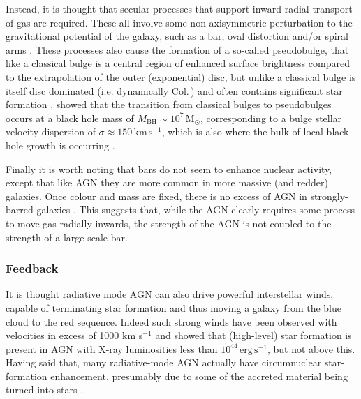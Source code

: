 			Instead, it is thought that secular processes that support inward radial transport of gas are required. These all involve some non-axisymmetric perturbation to the gravitational potential of the galaxy, such as a bar, oval distortion and/or spiral arms \citep[e.g.][]{Kormendy2004, Athanassoula2008, Sellwood2014}. These processes also cause the formation of a so-called pseudobulge, that like a classical bulge is a central region of enhanced surface brightness compared to the extrapolation of the outer (exponential) disc, but unlike a classical bulge is itself disc dominated (i.e. dynamically Col.\,) and often contains significant star formation \citep[e.g.][]{Gadotti2009}. \citet{Kormendy2013a} showed that the transition from classical bulges to pseudobulges occurs at a black hole mass of $M_\text{BH} \sim 10^7\,\mathrm{M_\odot}$, corresponding to a bulge stellar velocity dispersion of $\sigma \approx 150 \, \mathrm{km \, s^{-1}}$, which is also where the bulk of local black hole growth is occurring \citep[e.g.][]{Heckman2004, Kauffmann2009}. 

			Finally it is worth noting that bars do not seem to enhance nuclear activity, except that like AGN they are more common in more massive (and redder) galaxies. Once colour and mass are fixed, there is no excess of AGN in strongly-barred galaxies \citep[e.g.][]{Lee2012, Cisternas2013}. This suggests that, while the AGN clearly requires some process to move gas radially inwards, the strength of the AGN is not coupled to the strength of a large-scale bar. 


		\subsubsection{Feedback}
			\label{subsubsec:RadiativeFeedback}
			It is thought radiative mode AGN can also drive powerful interstellar winds, capable of terminating star formation and thus moving a galaxy from the blue cloud to the red sequence. Indeed such strong winds have been observed with velocities in excess of 1000 km s$^{-1}$ \citep{Fischer2010, Feruglio2010, Rupke2011} and \citet{Page2012} showed that (high-level) star formation is present in AGN with X-ray luminosities less than $10^{44} \, \mathrm{erg \, s^{-1}}$, but not above this. Having said that, many radiative-mode AGN actually have circumnuclear star-formation enhancement, presumably due to some of the accreted material being turned into stars \citep[e.g.][]{Santini2012}. 


